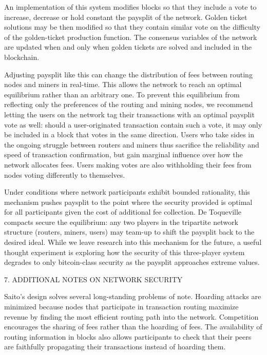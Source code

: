 \documentclass[11pt, oneside]{article}   	%
\begin{document}
\begin{multicols}{2}
An implementation of this system modifies blocks so that they include a vote to increase, decrease or hold constant the paysplit of the network. Golden ticket solutions may be then modified so that they contain similar vote on the difficulty of the golden-ticket production function. The consensus variables of the network are updated when and only when golden tickets are solved and included in the blockchain.

Adjusting paysplit like this can change the distribution of fees between routing nodes and miners in real-time. This allows the network to reach an optimal equilibrium rather than an arbitrary one. To prevent this equilibrium from reflecting only the preferences of the routing and mining nodes, we recommend letting the users on the network tag their transactions with an optimal paysplit vote as well: should a user-originated transaction contain such a vote, it may only be included in a block that votes in the same direction. Users who take sides in the ongoing struggle between routers and miners thus sacrifice the reliability and speed of transaction confirmation, but gain marginal influence over how the network allocates fees. Users making votes are also withholding their fees from nodes voting differently to themselves.

Under conditions where network participants exhibit bounded rationality, this mechanism pushes paysplit to the point where the security provided is optimal for all participants given the cost of additional fee collection. De Toqueville compacts secure the equilibrium: any two players in the tripartite network structure (routers, miners, users) may team-up to shift the paysplit back to the desired ideal. While we leave research into this mechanism for the future, a useful thought experiment is exploring how the security of this three-player system degrades to only bitcoin-class security as the paysplit approaches extreme values.


7. ADDITIONAL NOTES ON NETWORK SECURITY

Saito's design solves several long-standing problems of note. Hoarding attacks are minimized because nodes that participate in transaction routing maximize revenue by finding the most efficient routing path into the network. Competition encourages the sharing of fees rather than the hoarding of fees. The availability of routing information in blocks also allows participants to check that their peers are faithfully propagating their transactions instead of hoarding them.


\end{multicols}
\end{document}
